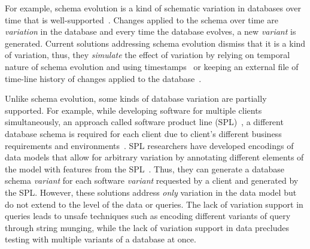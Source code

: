For example, schema evolution is a kind of schematic variation in databases
over time
that is well-supported~\cite{SchEvolRA90McKenzie, 
schVersioning97Castro, tempSchEvol91Ariav, tsql95Snodgrass, 
prima08Moon}.
Changes applied to the schema over time are \emph{variation} 
in the database and every time the database evolves, a new
\emph{variant} is generated.
Current solutions addressing schema
evolution dismiss that it is a kind of variation, thus,
they \emph{simulate} the effect of variation by
relying on temporal nature of schema evolution and using
timestamps~\cite{SchEvolRA90McKenzie, schVersioning97Castro, 
tempSchEvol91Ariav, tsql95Snodgrass} 
or keeping an external file of time-line history of 
changes applied to the database~\cite{prima08Moon}. 

Unlike schema evolution, some kinds of database variation are
partially supported. For example, while developing software for 
multiple clients simultaneously, an approach called software 
product line (SPL)~\cite{splBook}, a different database schema is 
required for each client  due to 
client's different business requirements and environments~\cite{skrhas09DBIS}.
% 
SPL researchers have developed
encodings of data models that allow for arbitrary variation by annotating
different elements of the model with features from the
SPL~\cite{skrhas09DBIS,slrs12CAiSE,ad11varDataModel}.
Thus, they can generate a database schema  \emph{variant} for 
each software \emph{variant} requested by a client and generated by the SPL. 
%
However, these solutions address \emph{only} variation in the data model but do not
extend to the level of the data or queries. The lack of variation support in
queries leads to unsafe techniques such as encoding different variants of query
through string munging, while the lack of variation support in data precludes
testing with multiple variants of a database at once.

